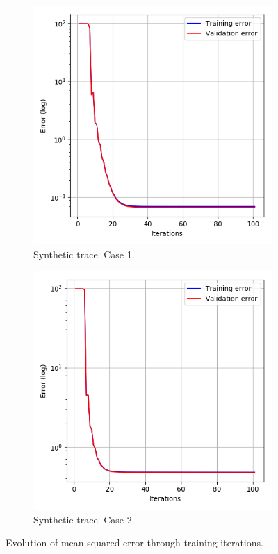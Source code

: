 \begin{figure}[b!]
	\centering
	\begin{subfigure}[b]{0.49\linewidth}
		\includegraphics[width=\linewidth]{pics/case1_err.png}
		\caption{Synthetic trace. Case 1.}
	\end{subfigure}
	\begin{subfigure}[b]{0.49\linewidth}
		\includegraphics[width=\linewidth]{pics/case2_err.png}
		\caption{Synthetic trace. Case 2.}
	\end{subfigure}
	\caption{Evolution of mean squared error through training iterations.}
	\label{fig:nn3}
\end{figure}

